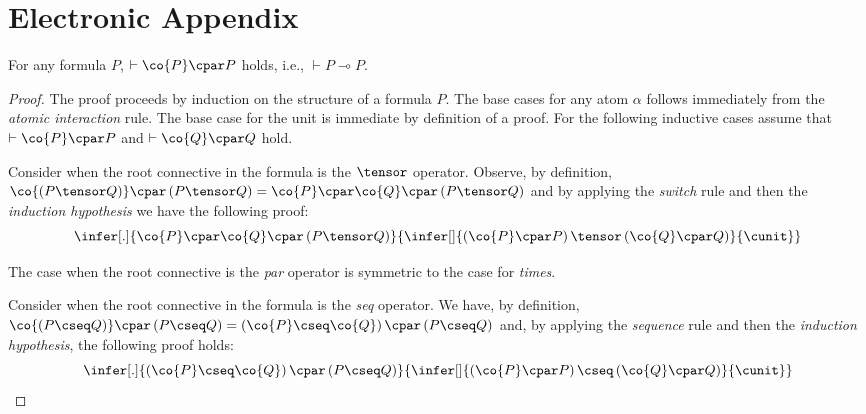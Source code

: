 \documentclass[UKenglish,acmsmall,authorversion]{acmart}
\theoremstyle{plain}
\begin{document}
\appendix

\section{Electronic Appendix}


\begin{proposition}
For any formula $P$, $\vdash \co{P} \cpar P$ holds, i.e., $\vdash P \multimap P$.
\end{proposition}
\begin{proof}
The proof proceeds by induction on the structure of a formula $P$.
The base cases for any atom $\alpha$ follows immediately from the \textit{atomic interaction} rule.%
The base case for the unit is immediate by definition of a proof. %
For the following inductive cases assume that $\vdash \co{P} \cpar P$ and $\vdash \co{Q} \cpar Q$ hold.

Consider when the root connective in the formula is the $\tensor$ operator. 
Observe, by definition, $\co{\left(P \tensor Q\right)} \cpar \left(P \tensor Q\right) = \co{P} \cpar \co{Q} \cpar \left(P \tensor Q\right)$ and 
by applying the \textit{switch} rule and then the \textit{induction hypothesis}
we have the following proof:
\[
\infer[.]{
\co{P} \cpar \co{Q} \cpar \left(P \tensor Q\right) 
}{
\infer[%
]{
\left( \co{P} \cpar P \right) \tensor \left( \co{Q} \cpar Q\right)
}{
\cunit
}}
\]

The case when the root connective is the \textit{par} operator is symmetric to the case for \textit{times}.

Consider when the root connective in the formula is the \textit{seq} operator. We have, by definition,
$ \co{\left(P \cseq Q\right)} \cpar \left(P \cseq Q\right)
    = \left(\co{P} \cseq \co{Q}\right) \cpar \left(P \cseq Q\right)$
and, by applying the \textit{sequence} rule and then the \textit{induction hypothesis}, the following proof holds:
\[
\infer[.]{
 \left(\co{P} \cseq \co{Q}\right) \cpar \left(P \cseq Q\right) 
}{
\infer[%
]{
\left( \co{P} \cpar P \right) \cseq \left( \co{Q} \cpar Q\right)
}{
\cunit
}}
\]


\end{proof}
\end{document}
